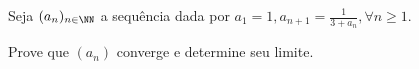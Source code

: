 Seja $(a_n)_{n \in \NN}$ a sequência dada por $a_1 = 1, a_{n+1} = \frac{1}{3+a_n}, \forall n \ge 1$.

Prove que $(a_n)$ converge e determine seu limite.
